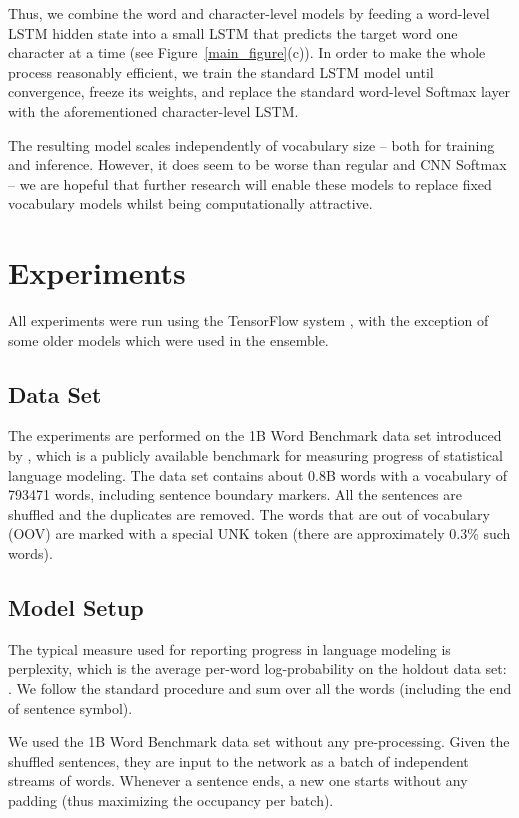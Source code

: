 \documentclass{article}
\begin{document}
Thus, we combine the word and character-level models by feeding a word-level LSTM hidden state  into a small LSTM that predicts the target word one character at a time (see Figure~\ref{main_figure}(c)). In order to make the whole process reasonably efficient, we train the standard LSTM model until convergence, freeze its weights, and replace the standard word-level Softmax layer with the aforementioned character-level LSTM.

The resulting model scales independently of vocabulary size -- both for training and inference. However, it does seem to be worse than regular and CNN Softmax -- we are hopeful that further research will enable these models to replace fixed vocabulary models whilst being computationally attractive.
 \section{Experiments}
\label{exps}

All experiments were run using the TensorFlow system \cite{tensorflow2015-whitepaper}, with the exception of some older models which were used in the ensemble.

\subsection{Data Set}
\label{data set}

The experiments are performed on the 1B Word Benchmark data set introduced by \cite{chelba2013one}, which is a publicly available benchmark for measuring progress of statistical language modeling. The data set contains about 0.8B words with a vocabulary of 793471 words, including sentence boundary markers. All the sentences are shuffled and the duplicates are removed. The words that are out of vocabulary (OOV) are marked with a special UNK token (there are approximately 0.3\% such words).

\subsection{Model Setup}
\label{experiments}

The typical measure used for reporting progress in language modeling is perplexity, which is the average per-word log-probability on the holdout data set: . We follow the standard procedure and sum over all the words (including the end of sentence symbol).

We used the 1B Word Benchmark data set without any pre-processing. Given the shuffled sentences, they are input to the network as a batch of independent streams of words. Whenever a sentence ends, a new one starts without any padding (thus maximizing the occupancy per batch).
\end{document}
